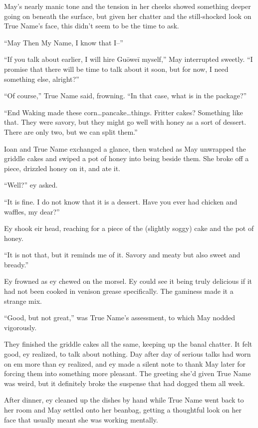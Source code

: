 May's nearly manic tone and the tension in her cheeks showed something deeper going on beneath the surface, but given her chatter and the still-shocked look on True Name's face, this didn't seem to be the time to ask.

``May Then My Name, I know that I--''

``If you talk about earlier, I will hire Guōweī myself,'' May interrupted sweetly. ``I promise that there will be time to talk about it soon, but for now, I need something else, alright?''

``Of course,'' True Name said, frowning. ``In that case, what is in the package?''

``End Waking made these corn\ldots pancake\ldots things. Fritter cakes? Something like that. They were savory, but they might go well with honey as a sort of dessert. There are only two, but we can split them.''

Ioan and True Name exchanged a glance, then watched as May unwrapped the griddle cakes and swiped a pot of honey into being beside them. She broke off a piece, drizzled honey on it, and ate it.

``Well?'' ey asked.

``It is fine. I do not know that it is a dessert. Have you ever had chicken and waffles, my dear?''

Ey shook eir head, reaching for a piece of the (slightly soggy) cake and the pot of honey.

``It is not that, but it reminds me of it. Savory and meaty but also sweet and bready.''

Ey frowned as ey chewed on the morsel. Ey could see it being truly delicious if it had not been cooked in venison grease specifically. The gaminess made it a strange mix.

``Good, but not great,'' was True Name's assessment, to which May nodded vigorously.

They finished the griddle cakes all the same, keeping up the banal chatter. It felt good, ey realized, to talk about nothing. Day after day of serious talks had worn on em more than ey realized, and ey made a silent note to thank May later for forcing them into something more pleasant. The greeting she'd given True Name was weird, but it definitely broke the suspense that had dogged them all week.

After dinner, ey cleaned up the dishes by hand while True Name went back to her room and May settled onto her beanbag, getting a thoughtful look on her face that usually meant she was working mentally.

